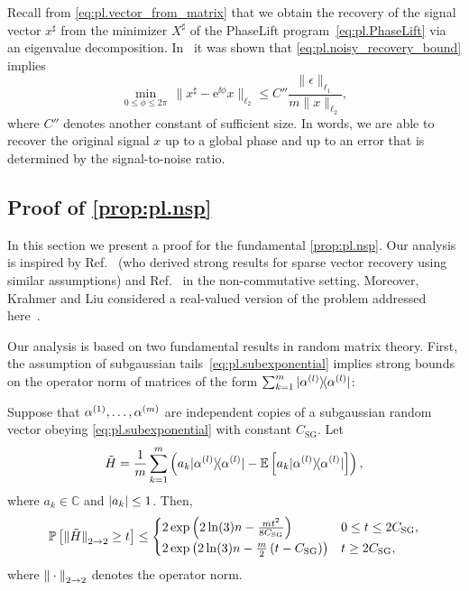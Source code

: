 Recall from \cref{eq:pl.vector_from_matrix} that we obtain the recovery of the signal vector ${x}^\sharp$ from the minimizer ${X}^\sharp$ of the PhaseLift program~\cref{eq:pl.PhaseLift} via an eigenvalue decomposition.
In~\cite{Candes_2012_Solving} it was shown that \cref{eq:pl.noisy_recovery_bound} implies
\[
  \min_{0 \leq \phi \leq 2 \pi} \, \| {x}^\sharp - \mathrm{e}^{\ii \phi} {x} \|_{\ell_2}
  \leq C'' \frac{\| \epsilon \|_{\ell_1} }{m \| {x} \|_{\ell_2}}
, \label{eq:vectorial_noisy_bound}
\]
where $C''$ denotes another constant of sufficient size.
In words, we are able to recover the original signal $x$ up to a global phase and up to an error that is determined by the signal-to-noise ratio.




\subsection{Proof of \cref{prop:pl.nsp}}%
\label{sub.nsp_proof}

In this section we present a proof for the fundamental \cref{prop:pl.nsp}.
Our analysis is inspired by Ref.~\cite{Dirksen_2017_On} (who derived strong results for sparse vector recovery using similar assumptions) and Ref.~\cite{Kabanava_2015_Stable} in the non-commutative setting.
Moreover, Krahmer and Liu considered a real-valued version of the problem addressed here~\cite{Krahmer_2018_Phase}.

Our analysis is based on two fundamental results in random matrix theory.
First, the assumption of subgaussian tails~\eqref{eq:pl.subexponential} implies strong bounds on the operator norm of matrices of the form $\sum_{k=1}^m \ketbra{\alpha\ind{l}}$:

\begin{theorem}%
  \label{thm:bernstein}
  Suppose that $\alpha^{(1)},\ldots,\alpha^{(m)}$ are independent copies of a subgaussian random vector obeying \cref{eq:pl.subexponential} with constant $C_\mathrm{SG}$.
  Let
  \[
    \tilde{ H} = \frac{1}{m} \sum_{k=1}^m \left( a_k \ketbra{\alpha\ind{l}} - \mathbb{E} \left[ a_k \ketbra{\alpha\ind{l}} \right] \right),
    \label{eq:pl.Htilde}
  \]
  where $a_k \in \mathbb{C}$ and ${\vert a_k\vert} \leq 1$.
  Then,
  \begin{align}
    \mathbb{P} \left[ {\Vert\tilde{ H}\Vert}_{2 \to 2} \geq t \right]
    \leq
    \begin{cases}
      2 \exp \left( 2 \ln (3) n  - \frac{mt^2}{8 C_\mathrm{SG}} \right) & 0 \leq t \leq 2C_\mathrm{SG}, \\
      2 \exp \left( 2 \ln (3) n - \frac{m}{2} \left( t - C_\mathrm{SG} \right)  \right) & t \geq 2 C_\mathrm{SG},
    \end{cases}
  \end{align}
  where ${\Vert\cdot\Vert}_{2 \to 2}$ denotes the operator norm.
\end{theorem}

